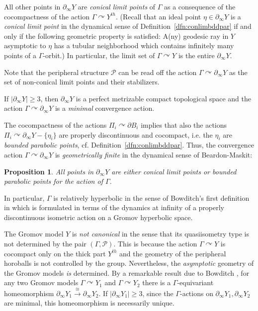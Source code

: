 \documentclass[12pt]{article}
\theoremstyle{boldplain}
\newtheorem{prop}[equation]{Proposition}
\theoremstyle{bolddefinition}
\numberwithin{equation}{section}
\def\Ga{\Gamma}
\def\acts{\curvearrowright}
\def\D{\partial}
\def\geo{\partial_{\infty}}
\begin{document}
All other points in $\geo Y$ are {\em conical limit points} of $\Ga$ 
as a consequence of the cocompactness of the action $\Ga\acts Y^{th}$.
(Recall that an ideal point $\eta\in\geo Y$ is a {\em conical limit point} in the dynamical sense of Definition~\ref{dfn:conlimbddpar}
if and only if the following geometric property is satisfied:
A(ny) geodesic ray in $Y$ asymptotic to $\eta$ has a tubular neighborhood 
which contains infinitely many points of a $\Ga$-orbit.)
In particular,
the limit set of $\Ga\acts Y$ is the entire $\geo Y$.

Note that the peripheral structure ${\mathcal P}$ can be read off the action $\Ga\acts\geo Y$
as the set of non-conical limit points and their stabilizers.

If $|\geo Y|\geq3$, 
then $\geo Y$ is a perfect metrizable compact topological space 
and the action $\Ga\acts\geo Y$ is a {\em minimal} convergence action.

The cocompactness of the actions $\Pi_i\acts\D B_i$ implies 
that also the actions $\Pi_i\acts\geo Y-\{\eta_i\}$ are properly discontinuous and cocompact,
i.e. the $\eta_i$ are {\em bounded parabolic points}, cf. Definition~\ref{dfn:conlimbddpar}.
Thus, the convergence action $\Ga\acts\geo Y$ is {\em geometrically finite} in the dynamical sense of Beardon-Maskit:

\begin{prop}
All points in $\geo Y$ are either conical limit points or bounded parabolic points
for the action of $\Ga$.
\end{prop}

In particular,
$\Ga$ is relatively hyperbolic in the sense of Bowditch's first definition in \cite{Bowditch2012}
which is formulated in terms of the dynamics at infinity of a properly discontinuous isometric action on a Gromov hyperbolic space.


\medskip
The Gromov model $Y$ is {\em not canonical} in the sense 
that its quasiisometry type is not determined by the pair $(\Ga, {\mathcal P})$.
This is because the action $\Ga\acts Y$ is cocompact only on the thick part $Y^{th}$
and the geometry of the peripheral horoballs is not controlled by the group.
Nevertheless, 
the {\em asymptotic} geometry of the Gromov models {\em is} determined.
By a remarkable result due to Bowditch \cite[Thm.~9.4]{Bowditch2012},
for any two Gromov models $\Ga\acts Y_1$ and $\Ga\acts Y_2$ 
there is a 
$\Ga$-equivariant homeomorphism $\geo Y_1\stackrel{\cong}{\to}\geo Y_2$. If $|\geo Y_1|\ge 3$, 
since the $\Ga$-actions on $\geo Y_1, \geo Y_2$ are minimal, this homeomorphism 
is necessarily unique. 
\end{document}
